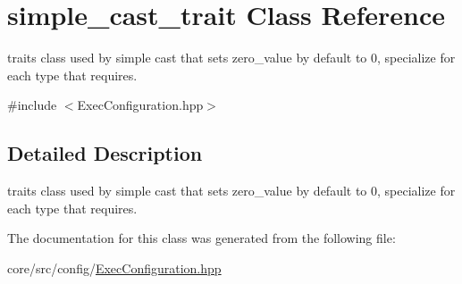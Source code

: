 \hypertarget{classsimple__cast__trait}{
\section{simple\_\-cast\_\-trait Class Reference}
\label{classsimple__cast__trait}
}


traits class used by simple cast that sets zero\_\-value by default to 0, specialize for each type that requires.  




{\ttfamily \#include $<$ExecConfiguration.hpp$>$}



\subsection{Detailed Description}
traits class used by simple cast that sets zero\_\-value by default to 0, specialize for each type that requires. 

The documentation for this class was generated from the following file:\begin{DoxyCompactItemize}
\item 
core/src/config/\hyperlink{ExecConfiguration_8hpp}{ExecConfiguration.hpp}\end{DoxyCompactItemize}
